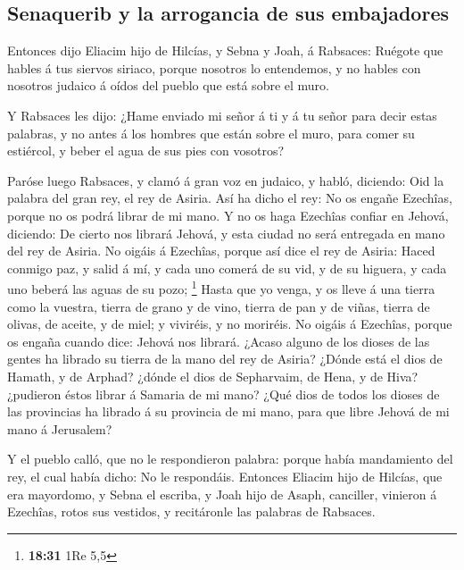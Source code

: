 \hypertarget{senaquerib-y-la-arrogancia-de-sus-embajadores}{%
\subsection{Senaquerib y la arrogancia de sus
embajadores}\label{senaquerib-y-la-arrogancia-de-sus-embajadores}}

 Entonces dijo Eliacim hijo de Hilcías, y Sebna y Joah, á
Rabsaces: Ruégote que hables á tus siervos siriaco, porque nosotros lo
entendemos, y no hables con nosotros judaico á oídos del pueblo que está
sobre el muro.

 Y Rabsaces les dijo: ¿Hame enviado mi señor á ti y á tu
señor para decir estas palabras, y no antes á los hombres que están
sobre el muro, para comer su estiércol, y beber el agua de sus pies con
vosotros?

 Paróse luego Rabsaces, y clamó á gran voz en judaico, y
habló, diciendo: Oid la palabra del gran rey, el rey de Asiria.
 Así ha dicho el rey: No os engañe Ezechîas, porque no os
podrá librar de mi mano.  Y no os haga Ezechîas confiar
en Jehová, diciendo: De cierto nos librará Jehová, y esta ciudad no será
entregada en mano del rey de Asiria.  No oigáis á
Ezechîas, porque así dice el rey de Asiria: Haced conmigo paz, y salid á
mí, y cada uno comerá de su vid, y de su higuera, y cada uno beberá las
aguas de su pozo; \footnote{\textbf{18:31} 1Re 5,5} 
Hasta que yo venga, y os lleve á una tierra como la vuestra, tierra de
grano y de vino, tierra de pan y de viñas, tierra de olivas, de aceite,
y de miel; y viviréis, y no moriréis. No oigáis á Ezechîas, porque os
engaña cuando dice: Jehová nos librará.  ¿Acaso alguno de
los dioses de las gentes ha librado su tierra de la mano del rey de
Asiria?  ¿Dónde está el dios de Hamath, y de Arphad?
¿dónde el dios de Sepharvaim, de Hena, y de Hiva? ¿pudieron éstos librar
á Samaria de mi mano?  ¿Qué dios de todos los dioses de
las provincias ha librado á su provincia de mi mano, para que libre
Jehová de mi mano á Jerusalem?

 Y el pueblo calló, que no le respondieron palabra:
porque había mandamiento del rey, el cual había dicho: No le respondáis.
 Entonces Eliacim hijo de Hilcías, que era mayordomo, y
Sebna el escriba, y Joah hijo de Asaph, canciller, vinieron á Ezechîas,
rotos sus vestidos, y recitáronle las palabras de Rabsaces.

